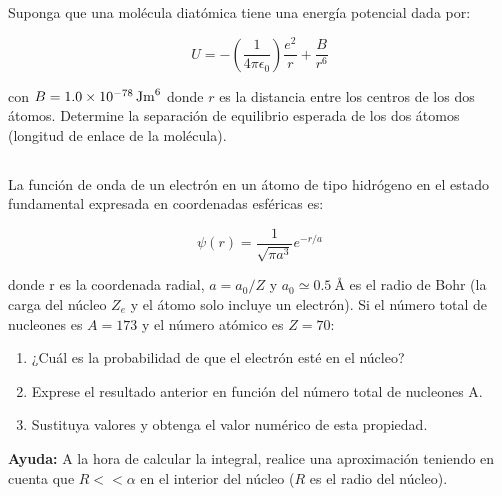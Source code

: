 \documentclass[12pt]{article}
\begin{document}
    \subsection{}
    Suponga que una molécula diatómica tiene una energía potencial dada por:

    $$U=-\left(\frac{1}{4\pi\epsilon_0}\right)\frac{e^2}{r}+\frac{B}{r^6}$$

    con $B=\SI{1.0d-78}{\J\meter^6}$ donde $r$ es la distancia entre los centros de los dos átomos.
    Determine la separación de equilibrio esperada de los dos átomos (longitud de enlace de la molécula).



    \subsection{}
    La función de onda de un electrón en un átomo de tipo hidrógeno en el estado fundamental
    expresada en coordenadas esféricas es:

    $$\psi(r)=\frac{1}{\sqrt{\pi a^3}}e^{-r/a}$$

    donde r es la coordenada radial, $a=a_0/Z$ y $a_0\simeq\SI{0.5}{\angstrom}$ es el radio de Bohr
    (la carga del núcleo $Z_e$ y el átomo solo incluye un electrón). Si el número total de
    nucleones es $A=173$ y el número atómico es $Z=70$:
    \begin{enumerate}[label=\alph*)]
        \item ¿Cuál es la probabilidad de que el electrón esté en el núcleo?
        \item Exprese el resultado anterior en función del número total de nucleones A.
        \item Sustituya valores y obtenga el valor numérico de esta propiedad.
    \end{enumerate}
    \textbf{Ayuda:} A la hora de calcular la integral, realice una aproximación teniendo en cuenta
    que $R<<\alpha$ en el interior del núcleo ($R$ es el radio del núcleo).
\end{document}
